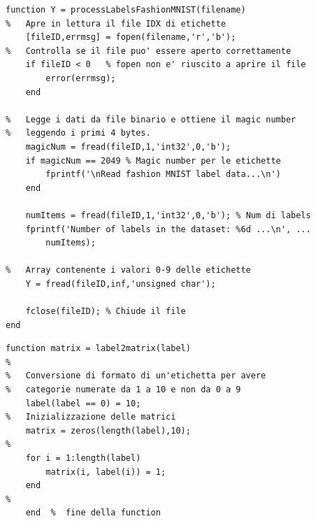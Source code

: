 \documentclass[a4paper,12pt]{article}
\begin{document}
\newpage
\begin{lstlisting}[style=Matlab-editor,title=\texttt{processLabelsFashionMNIST.m},label=lst:processlabels]
function Y = processLabelsFashionMNIST(filename)
%   Apre in lettura il file IDX di etichette
    [fileID,errmsg] = fopen(filename,'r','b');
%   Controlla se il file puo' essere aperto correttamente
    if fileID < 0   % fopen non e' riuscito a aprire il file
        error(errmsg);
    end

%   Legge i dati da file binario e ottiene il magic number 
%   leggendo i primi 4 bytes.
    magicNum = fread(fileID,1,'int32',0,'b');
    if magicNum == 2049 % Magic number per le etichette
        fprintf('\nRead fashion MNIST label data...\n')
    end

    numItems = fread(fileID,1,'int32',0,'b'); % Num di labels
    fprintf('Number of labels in the dataset: %6d ...\n', ... 
        numItems);

%   Array contenente i valori 0-9 delle etichette
    Y = fread(fileID,inf,'unsigned char');

    fclose(fileID); % Chiude il file
end
\end{lstlisting}



\vfill
\begin{lstlisting}[style=Matlab-editor,title=\texttt{label2matrix.m},label=lst:label2matrix]
function matrix = label2matrix(label)
%
%   Conversione di formato di un'etichetta per avere         
%   categorie numerate da 1 a 10 e non da 0 a 9
    label(label == 0) = 10;
%   Inizializzazione delle matrici
    matrix = zeros(length(label),10);
%
    for i = 1:length(label)
        matrix(i, label(i)) = 1;
    end
%
    end  %  fine della function
\end{lstlisting}
\end{document}
